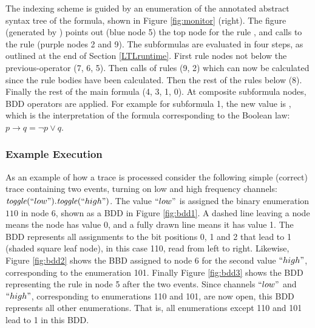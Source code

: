 The indexing scheme is guided by an enumeration of the annotated abstract syntax tree of the formula, shown in Figure \ref{fig:monitor} (right). The figure (generated by \dejavu) points out (blue node 5) the top node for the rule , and calls to the rule (purple nodes 2 and 9).
The subformulas are evaluated in four steps, as outlined at the end of Section \ref{LTLruntime}. First rule nodes not below the previous-operator  (7, 6, 5). Then calls of rules (9, 2)
which can now be calculated since the rule bodies have been calculated. Then the rest of the rules below   (8). Finally the rest of the main formula (4, 3, 1, 0). At composite subformula nodes, BDD operators are applied. For example for subformula  1, the new  value is , 
which is the interpretation of the formula 
 corresponding to the Boolean law:
$p \rightarrow q = \neg p \vee q$.

\subsubsection{Example Execution}

As an example of how a trace is processed consider the following simple (correct) trace containing two events, turning on low and high frequency channels:
$\mathit{toggle}(``low").\mathit{toggle}(``high")$. The value $``low"$ is assigned the binary enumeration $110$ in node 6, shown 
as a BDD in Figure \ref{fig:bdd1}. A dashed line leaving a node means the node has value 0, and a fully drawn line means it has value 1. The BDD represents all assignments to the bit positions 0, 1 and 2 that lead to 1 (shaded square leaf node), in this case 110, read from left to right. Likewise, Figure \ref{fig:bdd2} shows the BBD assigned to node 6 for the second value $``high"$, corresponding to the enumeration 101. Finally Figure \ref{fig:bdd3} shows the BDD representing the rule  in node 5 after the two events. Since channels $``low"$ and $``high"$, corresponding to enumerations 110 and 101, are now open, this BDD represents all other enumerations. That is, all enumerations except 110 and 101 lead to 1 in this BDD.

